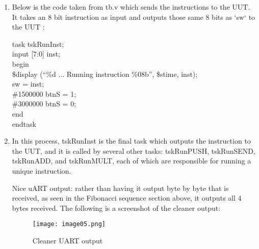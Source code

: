 \documentclass{article}
\begin{document}
\begin{enumerate}[label=\arabic*), ref=\arabic*]
\item Below is the code taken from tb.v which sends the instructions to the UUT. It takes an 8 bit instruction as input and outputs those same 8 bits as `sw` to the UUT : 
\begin{center}

task tskRunInst; \\
      input [7:0] inst; \\
begin \\
\$display (``\%d ... Running instruction \%08b'', \$stime, inst); \\
 sw = inst; \\
\#1500000 btnS = 1; \\
\#3000000 btnS = 0; \\
end \\
endtask
\end{center}
\item In this process, tskRunInst is the final task which outputs the instruction to the UUT,  and it is called by several other tasks: tskRunPUSH, tskRunSEND, tskRunADD, and tskRunMULT, each of which are responsible for running a unique instruction.
  
Nice uART output: rather than having it output byte by byte that is received, as seen in the Fibonacci sequence section above, it outputs all 4 bytes received.  The following is a screenshot of the cleaner output:

	\begin{figure}[H]
	\begin{center}
	\texttt{[image: image05.png]} 
	\caption{Cleaner UART output}
	\end{center}
	\end{figure}



\end{enumerate}


%

%

\end{document}
